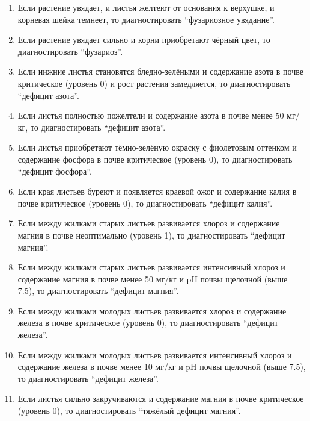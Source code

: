 \begin{enumerate}
    \item Если растение увядает, и листья желтеют от основания к верхушке, и корневая шейка темнеет, то диагностировать \enquote{фузариозное увядание}.

    \item Если растение увядает сильно и корни приобретают чёрный цвет, то диагностировать \enquote{фузариоз}.

    \item Если нижние листья становятся бледно-зелёными и содержание азота в почве критическое (уровень 0) и рост растения замедляется, то диагностировать \enquote{дефицит азота}.

    \item Если листья полностью пожелтели и содержание азота в почве менее 50 мг/кг, то диагностировать \enquote{дефицит азота}.

    \item Если листья приобретают тёмно-зелёную окраску с фиолетовым оттенком и содержание фосфора в почве критическое (уровень 0), то диагностировать \enquote{дефицит фосфора}.

    \item Если края листьев буреют и появляется краевой ожог и содержание калия в почве критическое (уровень 0), то диагностировать \enquote{дефицит калия}.

    \item Если между жилками старых листьев развивается хлороз и содержание магния в почве неоптимально (уровень 1), то диагностировать \enquote{дефицит магния}.

    \item Если между жилками старых листьев развивается интенсивный хлороз и содержание магния в почве менее 50 мг/кг и pH почвы щелочной (выше 7.5), то диагностировать \enquote{дефицит магния}.

    \item Если между жилками молодых листьев развивается хлороз и содержание железа в почве критическое (уровень 0), то диагностировать \enquote{дефицит железа}.

    \item Если между жилками молодых листьев развивается интенсивный хлороз и содержание железа в почве менее 10 мг/кг и pH почвы щелочной (выше 7.5), то диагностировать \enquote{дефицит железа}.

    \item Если листья сильно закручиваются и содержание магния в почве критическое (уровень 0), то диагностировать \enquote{тяжёлый дефицит магния}.


\end{enumerate}
